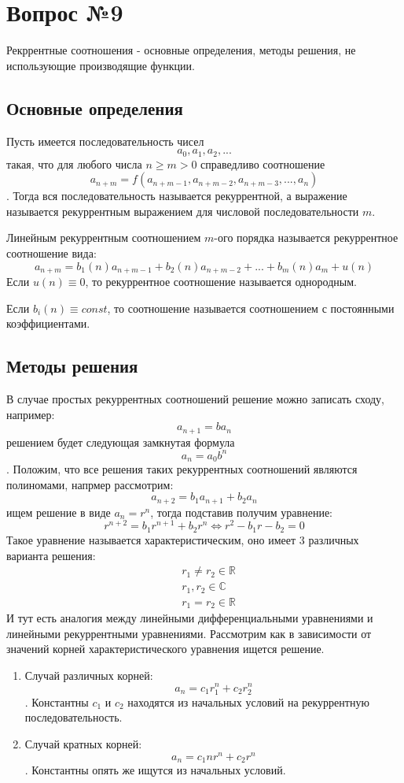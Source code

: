 \chapter{Вопрос №9}

Рекррентные соотношения - основные определения, методы решения, не использующие производящие функции.

\section{Основные определения}

Пусть имеется последовательность чисел $$ a_0, a_1, a_2, ... $$ такая, что для любого числа $n \ge m > 0$ справедливо соотношение $$ a_{n+m} = f\left(a_{n+m-1},a_{n+m-2},a_{n+m-3},...,a_n\right) $$. Тогда вся последовательность называется рекуррентной, а выражение называется рекуррентным выражением для числовой последовательности $m$.

Линейным рекуррентным соотношением $m$-ого порядка называется рекуррентное соотношение вида:
\begin{equation}
	a_{n+m} = b_1\left(n\right)a_{n+m-1} + b_2\left(n\right)a_{n+m-2} + ... + b_m\left(n\right)a_m + u\left(n\right)
\end{equation}
Если $u\left(n\right) \equiv 0$, то рекуррентное соотношение называется однородным.

Если $b_i\left(n\right) \equiv const$, то соотношение называется соотношением с постоянными коэффициентами.

\section{Методы решения}

В случае простых рекуррентных соотношений решение можно записать сходу, например:
\[
	a_{n+1} = ba_n
\]
решением будет следующая замкнутая формула $$ a_n = a_0 b^n $$. Положим, что все решения таких рекуррентных соотношений являются полиномами, напрмер рассмотрим:
\[
	a_{n+2} = b_1 a_{n+1} + b_2 a_n
\]
ищем решение в виде $a_n = r^n$, тогда подставив получим уравнение:
\[
	r^{n+2} = b_1 r^{n+1} + b_2 r^{n} \Leftrightarrow r^2 - b_1 r - b_2 = 0
\]
Такое уравнение называется характеристическим, оно имеет 3 различных варианта решения:
\[
	\begin{split}
		& r_1 \not = r_2 \in \mathbb{R}\\
		& r_1,r_2 \in \mathbb{C}\\
		& r_1 = r_2 \in \mathbb{R}
	\end{split}
\]
И тут есть аналогия между линейными дифференциальными уравнениями и линейными рекуррентными уравнениями. Рассмотрим как в зависимости от значений корней характеристического уравнения ищется решение.
\begin{enumerate}
\item Случай различных корней: $$ a_n = c_1 r_1^n + c_2 r_2^n $$. Константны $c_1$ и $c_2$ находятся из начальных условий на рекуррентную последовательность.

\item Случай кратных корней: $$ a_n = c_1 nr^n + c_2r^n $$. Константны опять же ищутся из начальных условий.
\end{enumerate}

